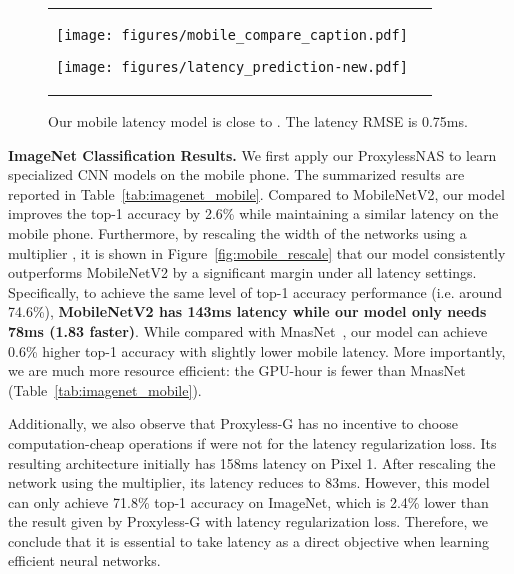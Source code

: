\documentclass{article} \usepackage{iclr2019_conference,times}
\newcommand{\minisection}[1]{\vspace{5pt}\noindent\textbf{#1.}}
\begin{document}
\begin{figure}[t]
    \centering
    \begin{tabular}{l  r}
    \begin{minipage}{0.40\linewidth}
        \texttt{[image: figures/mobile\_compare\_caption.pdf]}
        \caption{ProxylessNAS consistently outperforms MobileNetV2 under various latency settings.}
        \label{fig:mobile_rescale}
    \end{minipage}
    \qquad
    \begin{minipage}{0.42\linewidth}
        \texttt{[image: figures/latency\_prediction-new.pdf]}
        \caption{Our mobile latency model is close to . The latency RMSE is 0.75ms.}
        \label{fig:latency_prediction}
    \end{minipage}
    \end{tabular}
\end{figure}

\minisection{ImageNet Classification Results} We first apply our ProxylessNAS to learn specialized CNN models on the mobile phone. The summarized results are reported in Table~\ref{tab:imagenet_mobile}. Compared to MobileNetV2, our model improves the top-1 accuracy by 2.6\% while maintaining a similar latency on the mobile phone. Furthermore, by rescaling the width of the networks using a multiplier \citep{sandler2018mobilenetv2,tan2018mnasnet}, it is shown in Figure~\ref{fig:mobile_rescale} that our model consistently outperforms MobileNetV2 by a significant margin under all latency settings. Specifically, to achieve the same level of top-1 accuracy performance (i.e. around 74.6\%), \textbf{MobileNetV2 has 143ms latency while our model only needs 78ms (1.83 faster)}. While compared with MnasNet~\citep{tan2018mnasnet}, our model can achieve 0.6\% higher top-1 accuracy with slightly lower mobile latency. More importantly, we are much more resource efficient: the GPU-hour is  fewer than MnasNet (Table~\ref{tab:imagenet_mobile}). 

Additionally, we also observe that Proxyless-G has no incentive to choose computation-cheap operations if were not for the latency regularization loss. Its resulting architecture initially has 158ms latency on Pixel 1. After rescaling the network using the multiplier, its latency reduces to 83ms. However, this model can only achieve 71.8\% top-1 accuracy on ImageNet, which is 2.4\% lower than the result given by Proxyless-G with latency regularization loss. Therefore, we conclude that it is essential to take latency as a direct objective when learning efficient neural networks.
\end{document}
